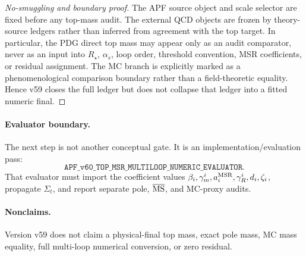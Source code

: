 \begin{proof}[No-smuggling and boundary proof]
The APF source object and scale selector are fixed before any top-mass audit.  The
external QCD objects are frozen by theory-source ledgers rather than inferred from
agreement with the top target.  In particular, the PDG direct top mass may appear
only as an audit comparator, never as an input into \(R_\star\), \(\alpha_s\), loop
order, threshold convention, MSR coefficients, or residual assignment.  The MC
branch is explicitly marked as a phenomenological comparison boundary rather than
a field-theoretic equality.  Hence v59 closes the full ledger but does not collapse
that ledger into a fitted numeric final.
\end{proof}

\paragraph{Evaluator boundary.}
The next step is not another conceptual gate.  It is an implementation/evaluation
pass:
\[
 \boxed{\texttt{APF\_v60\_TOP\_MSR\_MULTILOOP\_NUMERIC\_EVALUATOR}}.
\]
That evaluator must import the coefficient values \(\beta_i,\gamma_m^i,a_i^{\rm MSR},
\gamma_R^i,d_i,\zeta_i\), propagate \(\Sigma_t\), and report separate pole,
\(\overline{\rm MS}\), and MC-proxy audits.

\paragraph{Nonclaims.}
Version v59 does not claim a physical-final top mass, exact pole mass, MC mass
equality, full multi-loop numerical conversion, or zero residual.
